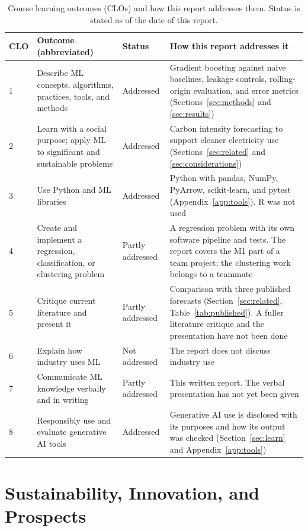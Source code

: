 \documentclass[10pt,journal,compsoc]{IEEEtran}
\begin{document}
\begin{table}[t]
\caption{Course learning outcomes (CLOs) and how this report addresses them. Status is stated as of the date of this report.}
\label{tab:clo}
\centering
\small
\begin{tabular}{@{}p{1.0cm}p{5.0cm}p{2.6cm}p{7.6cm}@{}}
\toprule
CLO & Outcome (abbreviated) & Status & How this report addresses it \\
\midrule
1 & Describe ML concepts, algorithms, practices, tools, and methods & Addressed & Gradient boosting against naive baselines, leakage controls, rolling-origin evaluation, and error metrics (Sections~\ref{sec:methods} and \ref{sec:results}) \\
2 & Learn with a social purpose; apply ML to significant and sustainable problems & Addressed & Carbon intensity forecasting to support cleaner electricity use (Sections~\ref{sec:related} and \ref{sec:considerations}) \\
3 & Use Python and ML libraries & Addressed & Python with pandas, NumPy, PyArrow, scikit-learn, and pytest (Appendix~\ref{app:tools}). R was not used \\
4 & Create and implement a regression, classification, or clustering problem & Partly addressed & A regression problem with its own software pipeline and tests. The report covers the M1 part of a team project; the clustering work belongs to a teammate \\
5 & Critique current literature and present it & Partly addressed & Comparison with three published forecasts (Section~\ref{sec:related}, Table~\ref{tab:published}). A fuller literature critique and the presentation have not been done \\
6 & Explain how industry uses ML & Not addressed & The report does not discuss industry use \\
7 & Communicate ML knowledge verbally and in writing & Partly addressed & This written report. The verbal presentation has not yet been given \\
8 & Responsibly use and evaluate generative AI tools & Addressed & Generative AI use is disclosed with its purposes and how its output was checked (Section~\ref{sec:learn} and Appendix~\ref{app:tools}) \\
\bottomrule
\end{tabular}
\end{table}

\section{Sustainability, Innovation, and Prospects}
\label{sec:sustain}
\end{document}
